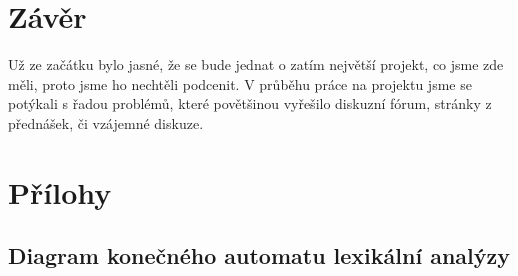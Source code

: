 \documentclass[a4paper, 12pt]{article}
\begin{document}
\section{Závěr} \label{zaver}

Už ze začátku bylo jasné, že se bude jednat o zatím největší projekt, co jsme zde měli, proto jsme ho nechtěli podcenit. V průběhu práce na projektu jsme se potýkali s řadou problémů, které povětšinou vyřešilo diskuzní fórum, stránky z přednášek, či vzájemné diskuze.

\newpage

\section{Přílohy} \label{prilohy}

\renewcommand\thesubsection{\thesection.\Alph{subsection}}
\subsection{Diagram konečného automatu lexikální analýzy} 

\begin{figure}[ht]
    \begin{center}
    \end{center}
\end{figure}


\newpage
\end{document}
